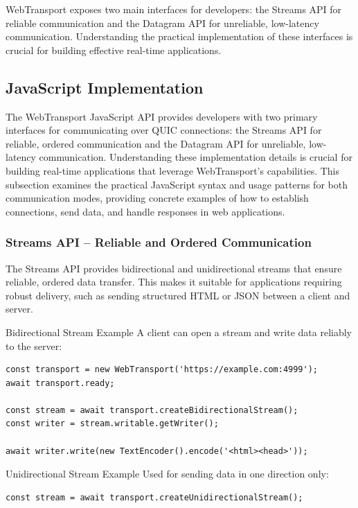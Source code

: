 WebTransport exposes two main interfaces for developers: the Streams API for reliable communication and the Datagram API for unreliable, low-latency communication. Understanding the practical implementation of these interfaces is crucial for building effective real-time applications.

\subsection{JavaScript Implementation}

The WebTransport JavaScript API provides developers with two primary interfaces for communicating over QUIC connections: the Streams API for reliable, ordered communication and the Datagram API for unreliable, low-latency communication. Understanding these implementation details is crucial for building real-time applications that leverage WebTransport's capabilities. This subsection examines the practical JavaScript syntax and usage patterns for both communication modes, providing concrete examples of how to establish connections, send data, and handle responses in web applications.

\subsubsection{Streams API – Reliable and Ordered Communication}

The Streams API provides bidirectional and unidirectional streams that ensure reliable, ordered data transfer. This makes it suitable for applications requiring robust delivery, such as sending structured HTML or JSON between a client and server.

Bidirectional Stream Example  
A client can open a stream and write data reliably to the server:

\begin{lstlisting}[breaklines=true,basicstyle=\small\ttfamily,frame=single]
const transport = new WebTransport('https://example.com:4999'); 
await transport.ready; 

const stream = await transport.createBidirectionalStream(); 
const writer = stream.writable.getWriter(); 

await writer.write(new TextEncoder().encode('<html><head>')); 
\end{lstlisting}

Unidirectional Stream Example  
Used for sending data in one direction only:

\begin{lstlisting}[breaklines=true,basicstyle=\small\ttfamily,frame=single]
const stream = await transport.createUnidirectionalStream();
\end{lstlisting}

